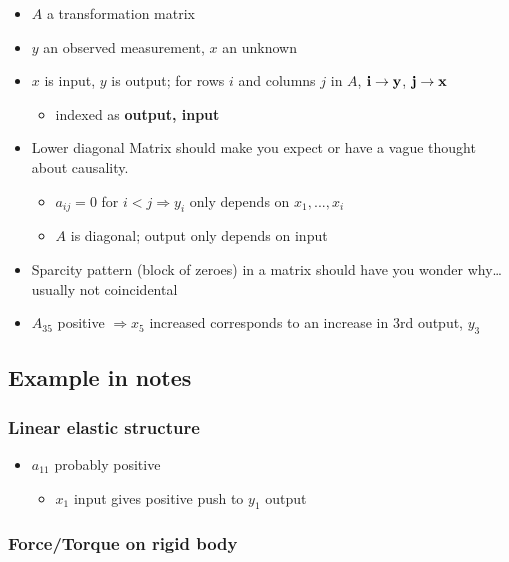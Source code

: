 \documentclass[10pt,letterpaper]{article}
\begin{document}
\begin{itemize}
\item $A$ a transformation matrix
\item $y$ an observed measurement, $x$ an unknown
\item $x$ is input, $y$ is output; for rows $i$ and columns $j$ in $A$, ${\bf i \rightarrow y}$, ${\bf j \rightarrow x}$

\begin{itemize}
\item indexed as \bf output, input
\end{itemize}

\item Lower diagonal Matrix should make you expect or have a vague thought about causality.

\begin{itemize}
\item $a_{ij}=0$ for $i<j \Rightarrow y_i$ only depends on $x_1,...,x_i$
\item $A$ is diagonal; output only depends on input
\end{itemize}

\item Sparcity pattern (block of zeroes) in a matrix should have you wonder why\ldots{}usually not coincidental
\item $A_{35}$ positive $\Rightarrow x_5$ increased corresponds to an increase in 3rd output, $y_3$
\end{itemize}
\subsection{Example in notes}
\label{sec-1_2}
\subsubsection{Linear elastic structure}
\label{sec-1_2_1}

\begin{itemize}
\item $a_{11}$ probably positive

\begin{itemize}
\item $x_1$ input gives positive push to $y_1$ output
\end{itemize}

\end{itemize}
\subsubsection{Force/Torque on rigid body}
\label{sec-1_2_2}
\end{document}
